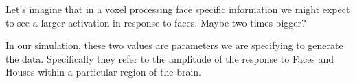 \documentclass[letterpaper,10pt,english]{sphinxmanual}
\begin{document}
\begin{sphinxVerbatim}[commandchars=\\\{\}]
  
  
  
\PYG{p}{[}  \PYG{p}{]}  
  
\PYG{p}{[}  \PYG{p}{]}  
  \PYG{p}{[}\PYG{p}{]}

 \PYG{p}{[} \PYG{p}{]}
\end{sphinxVerbatim}

\noindent{}

Let’s imagine that in a voxel processing face specific information we might expect to see a larger activation in response to faces. Maybe two times bigger?

In our simulation, these two values are parameters we are specifying to generate the data. Specifically they refer to the amplitude of the response to Faces and Houses within a particular region of the brain.
\end{document}
